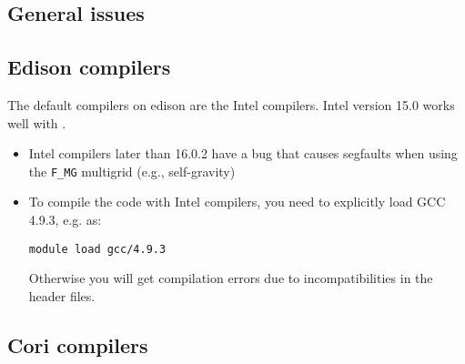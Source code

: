 \subsection{General issues}






\subsection{Edison compilers}

The default compilers on edison are the Intel compilers.  Intel version 15.0
works well with \castro.

\begin{itemize}
\item Intel compilers later than 16.0.2 have a bug that causes segfaults when using the 
  {\tt F\_MG} multigrid (e.g., self-gravity)

\item To compile the code with Intel compilers, you need to explicitly load GCC 4.9.3,
e.g. as:
\begin{verbatim}
module load gcc/4.9.3
\end{verbatim}
Otherwise you will get compilation errors due to incompatibilities in the header files.
\end{itemize}


\subsection{Cori compilers}

